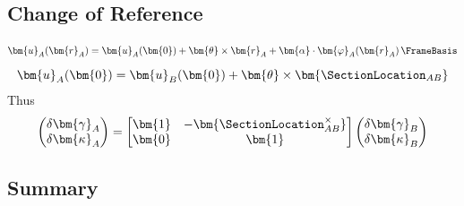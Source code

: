 \subsection{Change of Reference}
\begin{equation*}
    \bm{u}_A(\bm{r}_A) = \bm{u}_A(\bm{0}) + \bm{\theta}\times\bm{r}_A + \bm{\alpha}\cdot\bm{\varphi}_A(\bm{r}_A) \,\FrameBasis
\end{equation*}
%
\begin{equation*}
\bm{u}_A(\bm{0}) = \bm{u}_B(\bm{0}) + \bm{\theta}\times \bm{\SectionLocation_{AB}}
\end{equation*}
%
Thus
\begin{equation*}
\begin{pmatrix}
\delta\bm{\gamma}_A \\ \delta \bm{\kappa}_A
\end{pmatrix}
= \begin{bmatrix}
    \bm{1} & -\bm{\SectionLocation_{AB}^{\times}} \\
    \bm{0} & \bm{1}
\end{bmatrix}
\begin{pmatrix}
\delta \bm{\gamma}_B \\ \delta \bm{\kappa}_B
\end{pmatrix}
\end{equation*}


\subsection{Summary}